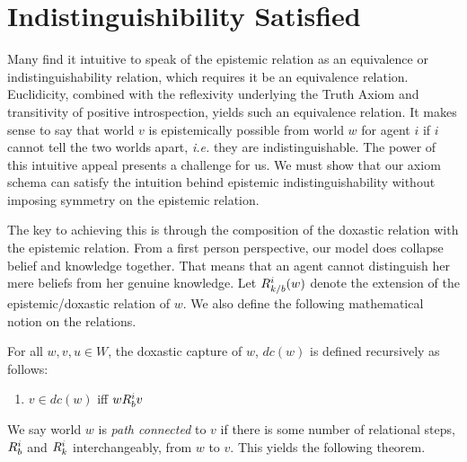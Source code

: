 \section{Indistinguishibility Satisfied}\label{sec:indist}

Many find it intuitive to speak of the epistemic relation as an equivalence or indistinguishability relation, which requires it be an equivalence relation. Euclidicity, combined with the reflexivity underlying the Truth Axiom and transitivity of positive introspection, yields such an equivalence relation. It makes sense to say that world $v$ is epistemically possible from world $w$ for agent $i$ if $i$ cannot tell the two worlds apart, \emph{i.e.} they are indistinguishable. The power of this intuitive appeal presents a challenge for us. We must show that our axiom schema can satisfy the intuition behind epistemic indistinguishability without imposing symmetry on the epistemic relation.

The key to achieving this is through the composition of the doxastic relation with the epistemic relation. From a first person perspective, our model does collapse belief and knowledge together. That means that an agent cannot distinguish her mere beliefs from her genuine knowledge. Let $R_{k/b}^i(w)$ denote the extension of the epistemic/doxastic relation of $w$. We also define the following mathematical notion on the relations.

\begin{definition}
	For all $w,v,u\in W$, the doxastic capture of $w$, $dc(w)$ is defined recursively as follows:
	\begin{enumerate}
		\item $v\in dc(w)$ iff $wR_{b}^iv$
	\end{enumerate}
\end{definition}

We say world $w$ is \emph{path connected} to $v$ if there is some number of relational steps, $R_{b}^i$ and $R_{k}^i$ interchangeably, from $w$ to $v$. This yields the following theorem.

